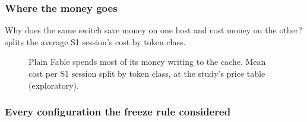 \subsubsection{Where the money goes}

Why does the same switch save money on one host and cost money on the other?  splits the average S1 session's cost by token class.

\begin{figure}[htbp]
\centering
{}\par\smallskip

\caption{Plain Fable spends most of its money writing to the cache. Mean cost per S1 session split by token class, at the study's price table (exploratory).}
\label{fig:composition}
\end{figure}


\subsubsection{Every configuration the freeze rule considered}


\begingroup\small
\FloatBarrier

\FloatBarrier
\endgroup

